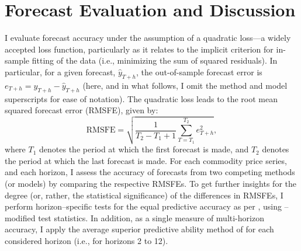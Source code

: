 \documentclass[11pt]{article}
\begin{document}
\section{Forecast Evaluation and Discussion}

I evaluate forecast accuracy under the assumption of a quadratic loss---a widely accepted loss function, particularly as it relates to the implicit criterion for in-sample fitting of the data (i.e., minimizing the sum of squared residuals). In particular, for a given forecast, $\hat{y}_{T+h}$, the out-of-sample forecast error is $e_{T+h} = y_{T+h}-\hat{y}_{T+h}$ (here, and in what follows, I omit the method and model superscripts for ease of notation). The quadratic loss leads to the root mean squared forecast error (RMSFE), given by: $$\text{RMSFE} = \sqrt{\frac{1}{T_2-T_1+1}\sum_{T=T_1}^{T_2}e_{T+h}^2},$$ where $T_1$ denotes the period at which the first forecast is made, and $T_2$ denotes the period at which the last forecast is made. For each commodity price series, and each horizon, I assess the accuracy of forecasts from two competing methods (or models) by comparing the respective RMSFEs. To get further insights for the degree (or, rather, the statistical significance) of the differences in RMSFEs, I perform horizon--specific tests for the equal predictive accuracy as per \cite{diebold1995}, using \cite{harvey1997}--modified test statistics. In addition, as a single measure of multi-horizon accuracy, I apply the average superior predictive ability method of \cite{quaedvlieg2021} for each considered horizon (i.e., for horizons 2 to 12).
\end{document}
